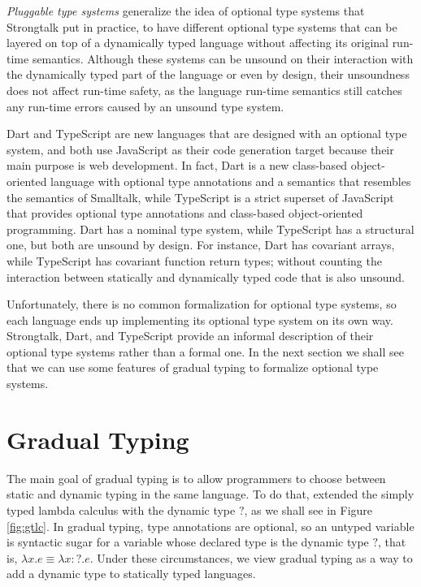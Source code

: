 \emph{Pluggable type systems} \citep{bracha2004pluggable} generalize
the idea of optional type systems that Strongtalk put in practice,
to have different optional type systems that can be layered on top
of a dynamically typed language without affecting its original run-time
semantics.
Although these systems can be unsound on their interaction with the
dynamically typed part of the language or even by design, their
unsoundness does not affect run-time safety, as the language run-time
semantics still catches any run-time errors caused by an unsound
type system.

Dart \citep{dart} and TypeScript \citep{typescript} are new
languages that are designed with an optional type system, and both
use JavaScript as their code generation target because their main
purpose is web development.
In fact, Dart is a new class-based object-oriented language with
optional type annotations and a semantics that resembles the
semantics of Smalltalk, while TypeScript is a strict superset of
JavaScript that provides optional type annotations and class-based
object-oriented programming.
Dart has a nominal type system, while TypeScript has a structural
one, but both are unsound by design.
For instance, Dart has covariant arrays, while TypeScript has
covariant function return types;
without counting the interaction between statically and dynamically
typed code that is also unsound.

Unfortunately, there is no common formalization for optional type
systems, so each language ends up implementing its optional type
system on its own way.
Strongtalk, Dart, and TypeScript provide an informal description of
their optional type systems rather than a formal one.
In the next section we shall see that we can use some features
of gradual typing \citep{siek2006gradual,siek2007objects} to
formalize optional type systems.

\section{Gradual Typing}

The main goal of gradual typing \citep{siek2006gradual} is to allow
programmers to choose between static and dynamic typing in the same
language.
To do that, \citet{siek2006gradual} extended the simply typed
lambda calculus with the dynamic type $?$, as we shall see in
Figure \ref{fig:gtlc}.
In gradual typing, type annotations are optional, so an untyped
variable is syntactic sugar for a variable whose declared type is
the dynamic type $?$, that is, $\lambda x.e \equiv \lambda x{:}?.e$.
Under these circumstances, we view gradual typing as a way to add
a dynamic type to statically typed languages.

